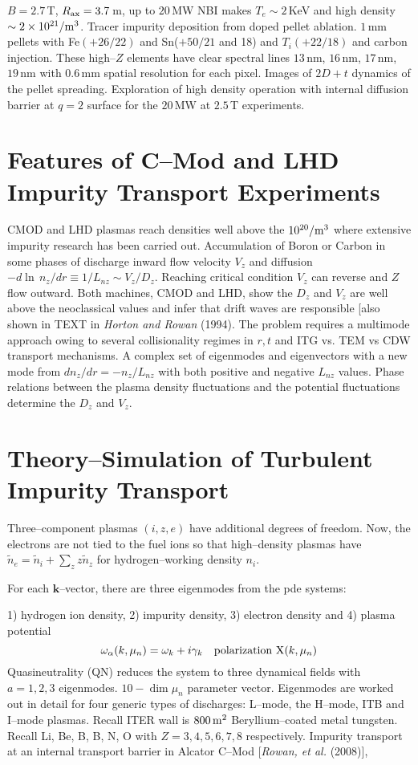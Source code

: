 \documentclass[a4paper,openany,12pt]{book}
\begin{document}
$B=2.7\,$T, $R_{\rm ax}=3.7\,$m, up to $20\,$MW NBI makes
$T_e\sim 2\,$KeV and high density $\sim 2\times 10^{21}/\rm m^3$.
Tracer impurity deposition from doped pellet ablation. $1\,$mm pellets with Fe$(+26/22)$ and Sn($+50/21$ and 18) and $T_i(+22/18)$ and carbon injection. These high--$Z$ elements have clear spectral lines $13\,$nm, $16\,$nm, $17\,$nm, $19\,$nm with $0.6\,$mm spatial resolution for each pixel. Images of $2D+t$ dynamics of the pellet spreading. Exploration of high density operation with internal diffusion barrier at $q=2$ surface for the $20\,$MW at $2.5\,$T experiments.

\section{Features of C--Mod and LHD Impurity Transport Experiments}

CMOD and LHD plasmas reach densities well above the $10^{20}/\rm m^3$ where extensive impurity research has been carried out.
Accumulation of Boron or Carbon in some phases of discharge inward flow velocity $V_z$ and diffusion $-d\ln\,n_z/dr\equiv 1/L_{nz}\sim V_z/D_z$.
Reaching critical condition $V_z$ can reverse and $Z$ flow outward.
Both machines, CMOD and LHD, show the $D_z$ and $V_z$ are well above the neoclassical values and infer that drift waves are responsible [also shown in TEXT in \emph{Horton and Rowan} (1994). The problem requires a multimode approach owing to several collisionality regimes in $r, t$ and ITG vs. TEM vs CDW transport mechanisms. A complex set of eigenmodes and eigenvectors with a new mode from $dn_z/dr=-n_z/L_{nz}$ with both positive and negative $L_{nz}$ values. Phase relations between the plasma density fluctuations and the potential fluctuations determine the $D_z$ and $V_z$.

\section{Theory--Simulation of Turbulent Impurity Transport}

Three--component plasmas $(i, z, e)$ have additional degrees of freedom. Now, the electrons are not tied to the fuel ions so that high--density plasmas have $\widetilde n_e=\widetilde n_i+\sum_z z\widetilde n_z$ for hydrogen--working density $n_i$.

For each $\bm{k}$--vector, there are three eigenmodes from the pde systems:

1) hydrogen ion density, 2) impurity density, 3) electron density and 4) plasma potential
$$\omega_\alpha (k, \mu_n)=\omega_k+i\gamma_k\quad{\rm polarization\ X}(k, \mu_n)$$
Quasineutrality (QN) reduces the system to three dynamical fields with $a=1,2,3$ eigenmodes. $10-\dim\mu_n$ parameter vector.
Eigenmodes are worked out in detail for four generic types of discharges: L--mode, the H--mode, ITB and I--mode plasmas.
Recall ITER wall is $800\,\rm m^2$ Beryllium--coated metal tungsten.
Recall Li, Be, B, B, N, O with $Z=3,4,5,6,7,8$ respectively.
Impurity transport at an internal transport barrier in Alcator C--Mod [\emph{Rowan, et al.} (2008)],
\end{document}
